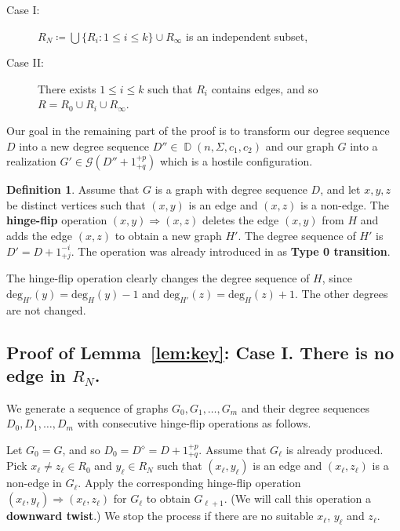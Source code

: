 \documentclass[11pt]{elsarticle}
\theoremstyle{plain}
\theoremstyle{definition}
\newtheorem{definition}[theorem]{Definition}
\def\G{\mathcal{G}}
\def\deg{\mathrm{deg}}
\newcommand{\dds}[4]{\operatorname{\mathbb D}(#1,#2,#3,#4)}
\newcommand{\hflip}[3]{(#1,#2)\Rightarrow (#1,#3)}
\begin{document}
\begin{description}
\item [Case I: ]  $R_N\coloneqq\bigcup\{R_i: 1\le i \le k\}\cup R_\infty$ is an  independent  subset,
\item [Case II:] There exists  $1\le i \le k$ such that  $R_i$ contains edges, and so $R=R_0\cup R_i\cup R_{\infty}$.
\end{description}

\medskip\noindent
Our goal in the remaining part of the proof is to transform our degree sequence $D$ into a new degree sequence $D''\in \dds{n}{\Sigma}{c_1}{c_2}$ and our graph $G$ into a realization $G' \in \G(D''+1_{+q}^{+p})$ which is a hostile configuration.


\begin{definition}\label{df:hingeflip}
Assume that $G$ is a graph with degree sequence $D$, and let $x,y,z$ be distinct vertices such that $(x,y)$ is an edge and $(x,z)$ is a non-edge. The \textbf{hinge-flip} operation $\hflip{x}{y}{z}$ deletes the edge $(x,y)$ from $H$ and adds the edge $(x,z)$ to obtain a new graph $H'$. The  degree sequence of $H'$ is $D'=D+1^{-i}_{+j}.$ The operation was already introduced in \cite{JS89} as \textbf{Type 0 transition}.
\end{definition}
\noindent The hinge-flip operation clearly changes the degree sequence of $H$, since $\deg_{H'}(y)=\deg_H(y)-1$ and $\deg_{H'}(z)=\deg_H(z)+1.$ The other degrees are not  changed.

\subsection{Proof of Lemma~\ref{lem:key}: Case I. There is no edge in $R_N$.}\label{sec:caseI}

We generate a sequence of graphs $G_0, G_1,\ldots, G_m$ and their degree sequences   $D_0, D_1, \ldots, D_m$ with consecutive hinge-flip operations as follows.

Let $G_0=G$, and so $D_0=D^\diamond=D+1^{+p}_{+q}$. Assume that $G_\ell$ is already produced. Pick $x_\ell \ne z_\ell \in R_0$ and $y_\ell \in R_N$ such that $(x_\ell, y_\ell)$ is an edge and $(x_\ell, z_\ell)$ is a non-edge in $G_\ell.$ Apply the corresponding hinge-flip operation
$\hflip{x_\ell}{y_\ell}{z_\ell}$ for $G_\ell$ to obtain $G_{\ell+1}$. (We will call this operation a \textbf{downward twist}.) We stop the process if there are no suitable $x_\ell$, $y_\ell$ and $z_\ell$.
\end{document}

